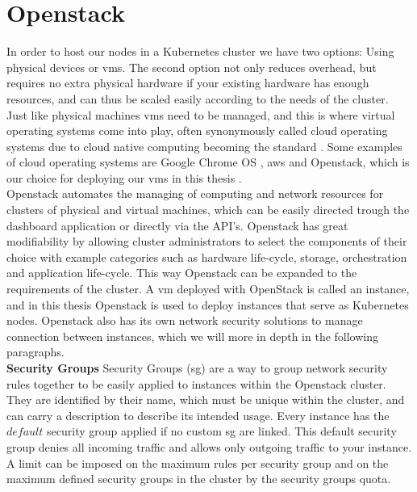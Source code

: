 \section{Openstack}\label{sec:openstack} In order to host our nodes in a Kubernetes cluster we have two options: Using physical devices or \acrlong{vm}s. The second option not only reduces overhead, but requires no extra physical hardware if your existing hardware has enough resources, and can thus be scaled easily according to the needs of the cluster. Just like physical machines \acrshort{vm}s need to be managed, and this is where virtual operating systems come into play, often synonymously called cloud operating systems due to cloud native computing becoming the standard \cite{CNCFSurvey}. Some examples of cloud operating systems are Google Chrome OS \cite{chromeos}, \acrshort{aws} \cite{aws} and Openstack, which is our choice for deploying our \acrshort{vm}s in this thesis \cite{Openstack}.
\\[10pt]

Openstack automates the managing of computing and network resources for clusters of physical and virtual machines, which can be easily directed trough the dashboard application or directly via the API's. Openstack has great modifiability by allowing cluster administrators to select the components of their choice with example categories such as hardware life-cycle, storage, orchestration and application life-cycle. This way Openstack can be expanded to the requirements of the cluster. A \acrshort{vm} deployed with OpenStack is called an instance, and in this thesis Openstack is used to deploy instances that serve as Kubernetes nodes. Openstack also has its own network security solutions to manage connection between instances, which we will more in depth in the following paragraphs.
\\[10pt]

\textbf{Security Groups}\label{sec:securitygroups} Security Groups (\acrshort{sg}) are a way to group network security rules together to be easily applied to instances within the Openstack cluster. They are identified by their name, which must be unique within the cluster, and can carry a description to describe its intended usage. Every instance has the $default$ security group applied if no custom \acrshort{sg} are linked. This default security group denies all incoming traffic and allows only outgoing traffic to your instance. A limit can be imposed on the maximum rules per security group and on the maximum defined security groups in the cluster by the security groups quota. \cite{sg} \cite{sgquotas}
\\[10pt]

